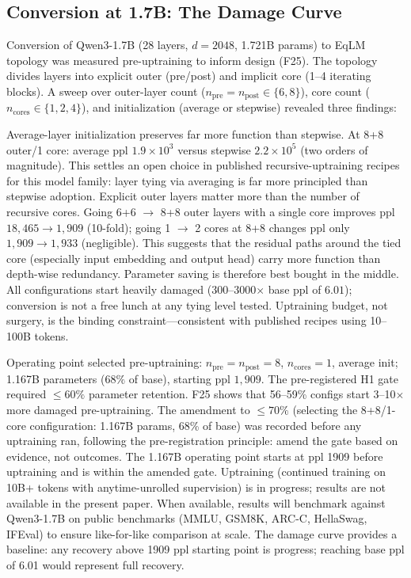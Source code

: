 \subsection{Conversion at 1.7B: The Damage Curve}
\label{sec:results:conversion}
\label{sec:conversion}

Conversion of Qwen3-1.7B (28 layers, $d=2048$, 1.721B params) to EqLM topology was measured pre-uptraining to inform design (F25). The topology divides layers into explicit outer (pre/post) and implicit core (1--4 iterating blocks). A sweep over outer-layer count ($n_{\text{pre}}=n_{\text{post}} \in \{6,8\}$), core count ($n_{\text{cores}} \in \{1,2,4\}$), and initialization (average or stepwise) revealed three findings:

Average-layer initialization preserves far more function than stepwise. At 8+8 outer/1 core: average ppl $1.9 \times 10^3$ versus stepwise $2.2 \times 10^5$ (two orders of magnitude). This settles an open choice in published recursive-uptraining recipes for this model family: layer tying via averaging is far more principled than stepwise adoption. Explicit outer layers matter more than the number of recursive cores. Going 6+6 $\to$ 8+8 outer layers with a single core improves ppl $18{,}465 \to 1{,}909$ (10-fold); going 1 $\to$ 2 cores at 8+8 changes ppl only $1{,}909 \to 1{,}933$ (negligible). This suggests that the residual paths around the tied core (especially input embedding and output head) carry more function than depth-wise redundancy. Parameter saving is therefore best bought in the middle. All configurations start heavily damaged (300--3000$\times$ base ppl of $6.01$); conversion is not a free lunch at any tying level tested. Uptraining budget, not surgery, is the binding constraint---consistent with published recipes using 10--100B tokens.

Operating point selected pre-uptraining: $n_{\text{pre}}=n_{\text{post}}=8$, $n_{\text{cores}}=1$, average init; 1.167B parameters ($68\%$ of base), starting ppl $1{,}909$. The pre-registered H1 gate required $\leq 60\%$ parameter retention. F25 shows that 56--59\% configs start 3--10$\times$ more damaged pre-uptraining. The amendment to $\leq 70\%$ (selecting the 8+8/1-core configuration: 1.167B params, 68\% of base) was recorded before any uptraining ran, following the pre-registration principle: amend the gate based on evidence, not outcomes. The 1.167B operating point starts at ppl 1909 before uptraining and is within the amended gate. Uptraining (continued training on 10B+ tokens with anytime-unrolled supervision) is in progress; results are not available in the present paper. When available, results will benchmark against Qwen3-1.7B on public benchmarks (MMLU, GSM8K, ARC-C, HellaSwag, IFEval) to ensure like-for-like comparison at scale. The damage curve provides a baseline: any recovery above 1909 ppl starting point is progress; reaching base ppl of 6.01 would represent full recovery.

